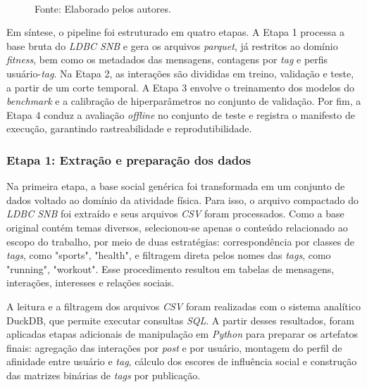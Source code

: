 \documentclass[a4paper,12pt]{article}
\begin{document}
{\begin{figure}[H]
\small \\ Fonte: Elaborado pelos autores.
\end{figure}

Em síntese, o pipeline foi estruturado em quatro etapas. A Etapa 1 processa a base bruta do \textit{LDBC SNB} e gera os arquivos \textit{parquet}, já restritos ao domínio \textit{fitness}, bem como os metadados das mensagens, contagens por \textit{tag} e perfis usuário-\textit{tag}. Na Etapa 2, as interações são divididas em treino, validação e teste, a partir de um corte temporal. A Etapa 3 envolve o treinamento dos modelos do \textit{benchmark} e a calibração de hiperparâmetros no conjunto de validação. Por fim, a Etapa 4 conduz a avaliação \textit{offline} no conjunto de teste e registra o manifesto de execução, garantindo rastreabilidade e reprodutibilidade.

\subsubsection{Etapa 1: Extração e preparação dos dados}

Na primeira etapa, a base social genérica foi transformada em um conjunto de dados voltado ao domínio da atividade física. Para isso, o arquivo compactado do \textit{LDBC SNB} foi extraído e seus arquivos \textit{CSV} foram processados. Como a base original contém temas diversos, selecionou-se apenas o conteúdo relacionado ao escopo do trabalho, por meio de duas estratégias: correspondência por classes de \textit{tags}, como "sports", "health", e filtragem direta pelos nomes das \textit{tags}, como "running", "workout". Esse procedimento resultou em tabelas de mensagens, interações, interesses e relações sociais.

A leitura e a filtragem dos arquivos \textit{CSV} foram realizadas com o sistema analítico DuckDB, que permite executar consultas \textit{SQL}. A partir desses resultados, foram aplicadas etapas adicionais de manipulação em \textit{Python} para preparar os artefatos finais: agregação das interações por \textit{post} e por usuário, montagem do perfil de afinidade entre usuário e \textit{tag}, cálculo dos escores de influência social e construção das matrizes binárias de \textit{tags} por publicação. 

}
\end{document}
